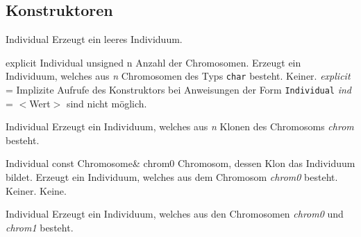 \documentclass{report}
\begin{document}
\subsection{Konstruktoren}

\setNormalInstance
\printEmptyMethod
{Individual}
{Erzeugt ein leeres Individuum.}

\vspace{4ex}

\setNormalInstance
\printMethodWithOneParam
{explicit}
{Individual}
{unsigned}
{n}
{Anzahl der Chromosomen.}
{Erzeugt ein Individuum, welches aus {\em n} Chromosomen des
    Typs {\tt char} besteht.}
{Keiner.}
{{\em explicit} = Implizite Aufrufe des Konstruktors bei Anweisungen
 der Form {\tt Individual} {\em ind} = $<$Wert$>$ sind nicht m\"oglich.}

\newpage

\setNormalInstance
\setCorrectWidthThree{8pt}
\printMethodWithParamsSaved
{}
{}
{Individual}
{Erzeugt ein Individuum, welches aus {\em n} Klonen des 
                    Chromosoms
    {\em chrom} besteht.}
{}
\setCorrectWidthThree{4pt}

\vspace{4ex}

\setNormalInstance
\printMethodWithOneParam
{}
{Individual}
{const Chromosome\&}
{chrom0}
{Chromosom, dessen Klon das Individuum bildet.}
{Erzeugt ein Individuum, welches aus dem Chromosom
    {\em chrom0} besteht.}
{Keiner.}
{Keine.}

\vspace{4ex}

\setNormalInstance
\setCorrectWidthThree{8pt}
\printMethodWithParamsSaved
{}
{}
{Individual}
{Erzeugt ein Individuum, welches aus den Chromosomen
    {\em chrom0} und {\em chrom1} besteht.}
{}
\setCorrectWidthThree{4pt}
\end{document}
